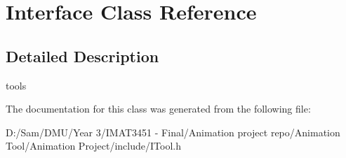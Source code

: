 \hypertarget{class_interface}{}\section{Interface Class Reference}
\label{class_interface}


\subsection{Detailed Description}
tools 

The documentation for this class was generated from the following file\+:\begin{DoxyCompactItemize}
\item 
D\+:/\+Sam/\+D\+M\+U/\+Year 3/\+I\+M\+A\+T3451 -\/ Final/\+Animation project repo/\+Animation Tool/\+Animation Project/include/I\+Tool.\+h\end{DoxyCompactItemize}
